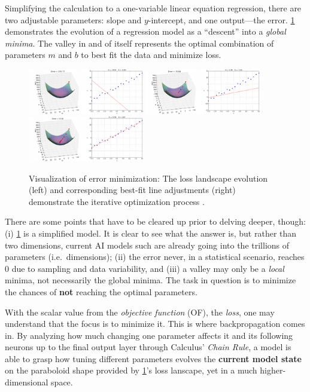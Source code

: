 \documentclass[conference]{IEEEtran}
\begin{document}
Simplifying the calculation to a one-variable linear equation regression, there are two adjustable parameters: slope and $y$-intercept, and one output---the error. \cref{fig:training_evolution} demonstrates the evolution of a regression model as a ``descent'' into a \textit{global minima}. The valley in and of itself represents the optimal combination of parameters $m$ and $b$ to best fit the data and minimize loss.

\begin{figure}[htbp]
    \centering
    \includegraphics[width=0.45\textwidth]{images/frame_00_delay-0.2s.png}
    \includegraphics[width=0.45\textwidth]{images/frame_04_delay-0.2s.png}
    \includegraphics[width=0.45\textwidth]{images/frame_19_delay-0.2s.png}
    \caption{Visualization of error minimization: The loss landscape evolution (left) and corresponding best-fit line adjustments (right) demonstrate the iterative optimization process \cite{fig-yennhi95zz_evolution}.}
    \label{fig:training_evolution}
\end{figure}

There are some points that have to be cleared up prior to delving deeper, though: (i) \cref{fig:training_evolution} is a simplified model. It is clear to see what the answer is, but rather than two dimensions, current AI models such are already going into the trillions of parameters (i.e.\ dimensions); (ii) the error never, in a statistical scenario, reaches 0 due to sampling and data variability, and (iii) a valley may only be a \textit{local} minima, not necessarily the global minima. The task in question is to minimize the chances of \textbf{not} reaching the optimal parameters.

With the scalar value from the \textit{objective function} (OF), the \textit{loss}, one may understand that the focus is to minimize it. This is where backpropagation comes in. By analyzing how much changing one parameter affects it and its following neurons up to the final output layer through Calculus' \textit{Chain Rule}, a model is able to grasp how tuning different parameters evolves the \textbf{current model state} on the paraboloid shape provided by \cref{fig:training_evolution}'s loss lanscape, yet in a much higher-dimensional space.
\end{document}
